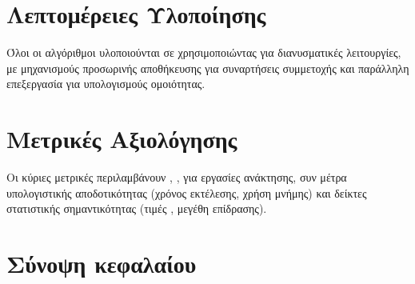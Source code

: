 \section{Λεπτομέρειες Υλοποίησης}
Όλοι οι αλγόριθμοι υλοποιούνται σε  χρησιμοποιώντας  για διανυσματικές λειτουργίες, με μηχανισμούς προσωρινής αποθήκευσης για συναρτήσεις συμμετοχής και παράλληλη επεξεργασία για υπολογισμούς ομοιότητας.

\section{Μετρικές Αξιολόγησης}
Οι κύριες μετρικές περιλαμβάνουν , ,  για εργασίες ανάκτησης, συν μέτρα υπολογιστικής αποδοτικότητας (χρόνος εκτέλεσης, χρήση μνήμης) και δείκτες στατιστικής σημαντικότητας (τιμές , μεγέθη επίδρασης).


\section{Σύνοψη κεφαλαίου}
